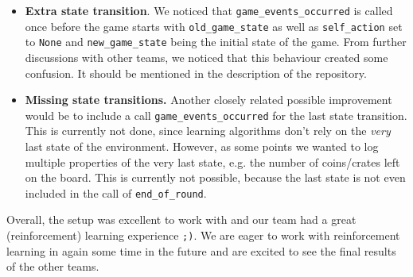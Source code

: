 \begin{itemize}
	\item \textbf{Extra state transition}. We noticed that \texttt{game\_events\_occurred} is called once before the game starts with \texttt{old\_game\_state} as well as \texttt{self\_action} set to \texttt{None} and \texttt{new\_game\_state} being the initial state of the game. From further discussions with other teams, we noticed that this behaviour created some confusion. It should be mentioned in the description of the repository. \\
	
	\item \textbf{Missing state transitions.} Another closely related possible improvement would be to include a call \texttt{game\_events\_occurred} for the last state transition. This is currently not done, since learning algorithms don't rely on the \emph{very} last state of the environment. However, as some points we wanted to log multiple properties of the very last state, e.g. the number of coins/crates left on the board. This is currently not possible, because the last state is not even included in the call of \texttt{end\_of\_round}. 
\end{itemize}

Overall, the setup was excellent to work with and our team had a great (reinforcement) learning experience \texttt{;)}. We are eager to work with reinforcement learning in again some time in the future and are excited to see the final results of the other teams. 